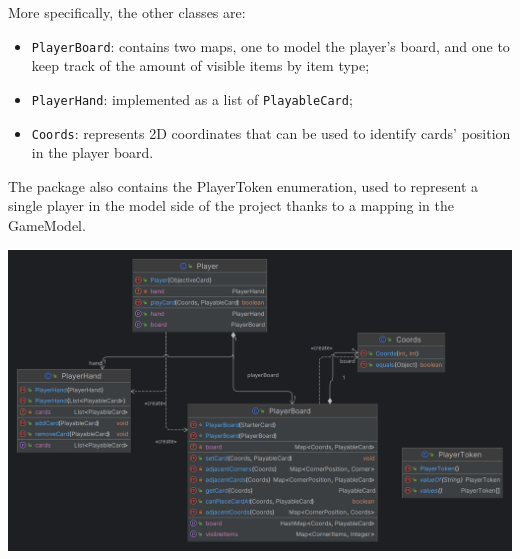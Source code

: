 \documentclass{article}
\begin{document}
\noindent
More specifically, the other classes are:
\begin{itemize}
    \item \texttt{PlayerBoard}: contains two maps, one to model the player's board, and one to keep track of the amount of visible items by item type;
    \item \texttt{PlayerHand}: implemented as a list of \texttt{PlayableCard};
    \item \texttt{Coords}: represents 2D coordinates that can be used to identify cards' position in the player board.
\end{itemize}
\noindent
The package also contains the PlayerToken enumeration, used to represent a single player in the model side of the project thanks to a mapping in the GameModel.

\begin{center}
    \hspace*{-2cm}\includegraphics[scale=0.2]{player.png}
\end{center}
\end{document}
